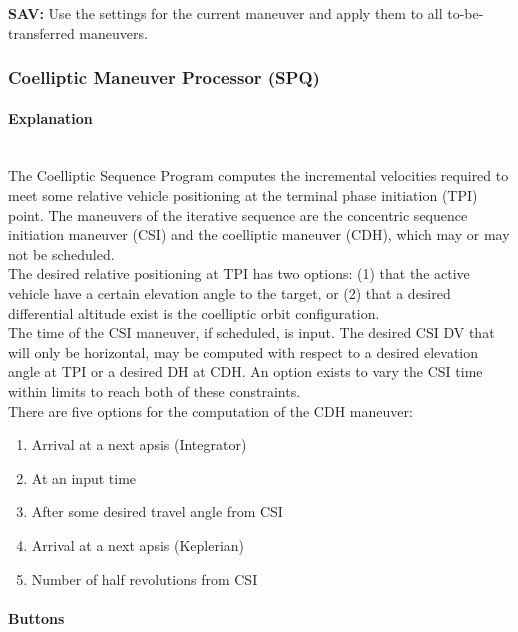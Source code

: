 \documentclass[11pt]{article} %
\begin{document}
\textbf{SAV:} Use the settings for the current maneuver and apply them to all to-be-transferred maneuvers.\\
\newpage
\subsubsection{Coelliptic Maneuver Processor (SPQ)}

\paragraph{Explanation}\mbox{} \\

The Coelliptic Sequence Program computes the incremental velocities required to meet some relative vehicle positioning at the terminal phase initiation (TPI)
point. The maneuvers of the iterative sequence are the concentric sequence initiation maneuver (CSI) and the coelliptic maneuver (CDH), which may or may not be scheduled.\\

The desired relative positioning at TPI has two options: (1) that the active vehicle have a certain elevation angle to the target, or (2) that a desired differential altitude exist is the coelliptic orbit configuration.\\

The time of the CSI maneuver, if scheduled, is input. The desired CSI DV that will only be horizontal, may be computed with respect to a desired elevation
angle at TPI or a desired DH at CDH. An option exists to vary the CSI time within limits to reach both of these constraints.\\

There are five options for the computation of the CDH maneuver:
\begin{enumerate}
	\item Arrival at a next apsis (Integrator)
	\item At an input time
	\item After some desired travel angle from CSI
	\item Arrival at a next apsis (Keplerian)
	\item Number of half revolutions from CSI
\end{enumerate}

\paragraph{Buttons}\mbox{} \\
\end{document}
